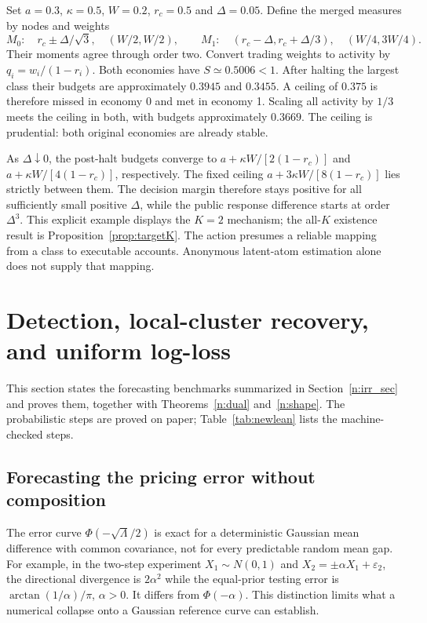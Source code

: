 \documentclass[12pt]{article}
\theoremstyle{definition}
\theoremstyle{remark}
\begin{document}
Set $a=0.3$, $\kappa=0.5$, $W=0.2$, $r_c=0.5$ and $\Delta=0.05$. Define the merged measures by nodes and weights
\[
M_0:\quad r_c\pm\Delta/\sqrt3,\quad (W/2,W/2),
\qquad
M_1:\quad (r_c-\Delta,r_c+\Delta/3),\quad(W/4,3W/4).
\]
Their moments agree through order two. Convert trading weights to activity by $q_i=w_i/(1-r_i)$. Both economies have $S\simeq0.5006<1$. After halting the largest class their budgets are approximately $0.3945$ and $0.3455$. A ceiling of $0.375$ is therefore missed in economy 0 and met in economy 1. Scaling all activity by $1/3$ meets the ceiling in both, with budgets approximately $0.3669$. The ceiling is prudential: both original economies are already stable.

As $\Delta\downarrow0$, the post-halt budgets converge to $a+\kappa W/[2(1-r_c)]$ and $a+\kappa W/[4(1-r_c)]$, respectively. The fixed ceiling $a+3\kappa W/[8(1-r_c)]$ lies strictly between them. The decision margin therefore stays positive for all sufficiently small positive $\Delta$, while the public response difference starts at order $\Delta^3$. This explicit example displays the $K=2$ mechanism; the all-$K$ existence result is Proposition~\ref{prop:targetK}. The action presumes a reliable mapping from a class to executable accounts. Anonymous latent-atom estimation alone does not supply that mapping.


\section{Detection, local-cluster recovery, and uniform log-loss}\label{app:incoming}

This section states the forecasting benchmarks summarized in Section~\ref{n:irr_sec} and proves them, together with Theorems~\ref{n:dual} and~\ref{n:shape}. The probabilistic steps are proved on paper; Table~\ref{tab:newlean} lists the machine-checked steps.

\subsection{Forecasting the pricing error without composition}\label{app:forecastbench}

The error curve $\Phi(-\sqrt{\Lambda}/2)$ is exact for a deterministic Gaussian mean difference with common covariance, not for every predictable random mean gap. For example, in the two-step experiment $X_1\sim N(0,1)$ and $X_2=\pm\alpha X_1+\varepsilon_2$, the directional divergence is $2\alpha^2$ while the equal-prior testing error is $\arctan(1/\alpha)/\pi$, $\alpha>0$. It differs from $\Phi(-\alpha)$. This distinction limits what a numerical collapse onto a Gaussian reference curve can establish.
\end{document}

